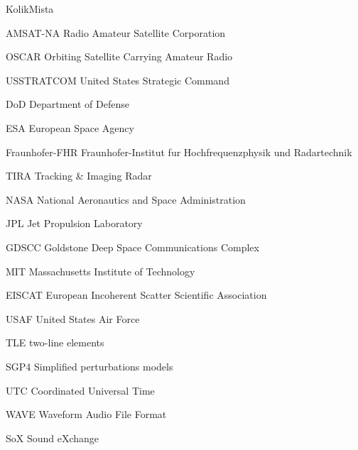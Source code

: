 \begin{seznamzkratek}{KolikMista}

      {AMSAT-NA}                             %
      {Radio Amateur Satellite Corporation}  %

      {OSCAR}
      {Orbiting Satellite Carrying Amateur Radio}

      {USSTRATCOM}
      {United States Strategic Command}

      {DoD}
      {Department of Defense}

      {ESA}
      {European Space Agency}

      {Fraunhofer-FHR}
      {Fraunhofer-Institut fur Hochfrequenzphysik und Radartechnik}

      {TIRA}
      {Tracking \& Imaging Radar}

      {NASA}
      {National Aeronautics and Space Administration}

      {JPL}
      {Jet Propulsion Laboratory}

      {GDSCC}
      {Goldstone Deep Space Communications Complex}

      {MIT}
      {Massachusetts Institute of Technology}

      {EISCAT}
      {European Incoherent Scatter Scientific Association}

      {USAF}
      {United States Air Force}

      {TLE}
      {two-line elements}

      {SGP4}
      {Simplified perturbations models}

      {UTC}
      {Coordinated Universal Time}

      {WAVE}
      {Waveform Audio File Format}

      {SoX}
      {Sound eXchange}




\end{seznamzkratek}
